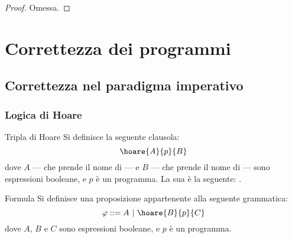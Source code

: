 \documentclass[a4paper, 12pt]{report}
\begin{document}
    \begin{proof}
        Omessa.
    \end{proof}

    \chapter{Correttezza dei programmi}
    
    \section{Correttezza nel paradigma imperativo}

    \subsection{Logica di Hoare}

    \begin{frameddefn}{Tripla di Hoare}
        Si definisce  la seguente clausola: $$\hoare{A}{p}{B}$$ dove $A$ --- che prende il nome di  --- e $B$ --- che prende il nome di  --- sono espressioni booleane, e $p$ è un programma. La sua  è la seguente: .
    \end{frameddefn}

    \begin{frameddefn}[label={formula}]{Formula}
        Si definisce  una proposizione appartenente alla seguente grammatica: $$\varphi ::= A \ | \ \hoare{B}{p}{C}$$ dove $A$, $B$ e $C$ sono espressioni booleane, e $p$ è un programma.
    \end{frameddefn}
\end{document}
